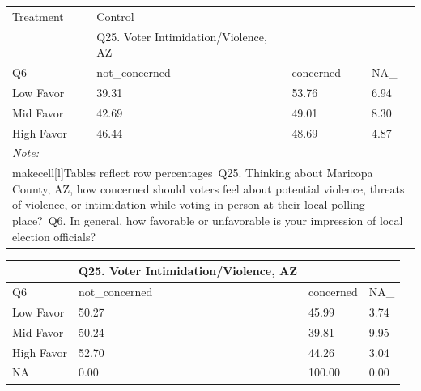 \documentclass[
  11pt,
  a4paper,
]{article}
\begin{document}
\begin{table}
\centering
\centering
\begin{tabular}[t]{l|l|l|l}
\hline
\multicolumn{1}{l|}{Treatment} & \multicolumn{1}{l}{Control} \\
\cline{1-1} \cline{2-2}
 & Q25. Voter Intimidation/Violence, AZ &  & \\
\hline
Q6 & not\_concerned & concerned & NA\_\\
\hline
Low Favor & 39.31 & 53.76 & 6.94\\
\hline
Mid Favor & 42.69 & 49.01 & 8.30\\
\hline
High Favor & 46.44 & 48.69 & 4.87\\
\hline
\multicolumn{4}{l}{\rule{0pt}{1em}\textit{Note: }}\\
\multicolumn{4}{l}{\rule{0pt}{1em}makecell[l]{Tables reflect row percentages\ Q25. Thinking about Maricopa County, AZ, how concerned should voters feel about potential violence, threats of violence, or intimidation while voting in person at their local polling place?\ Q6. In general, how favorable or unfavorable is your impression of local election officials?}}\\
\end{tabular}
\centering
\begin{tabular}[t]{l|l|l|l}
\hline
 & Q25. Voter Intimidation/Violence, AZ &  & \\
\hline
Q6 & not\_concerned & concerned & NA\_\\
\hline
Low Favor & 50.27 & 45.99 & 3.74\\
\hline
Mid Favor & 50.24 & 39.81 & 9.95\\
\hline
High Favor & 52.70 & 44.26 & 3.04\\
\hline
NA & 0.00 & 100.00 & 0.00\\
\hline
\end{tabular}
\end{table}
\end{document}
